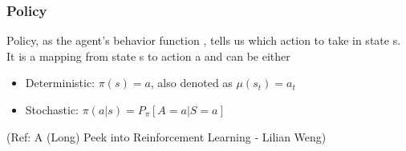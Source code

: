 \begin{frame}[fragile]\frametitle{Policy}

Policy, as the agent's behavior function  , tells us which action to take in state s. It is a mapping from
state s to action a and can be either 

\begin{itemize}
\item Deterministic: $\pi(s)=a$, also denoted as $\mu(s_t)=a_t$
\item Stochastic: $\pi (a|s) = P_{\pi}[A=a|S=a]$
\end{itemize}


{\tiny (Ref: A (Long) Peek into Reinforcement Learning - Lilian Weng)}

\end{frame}















